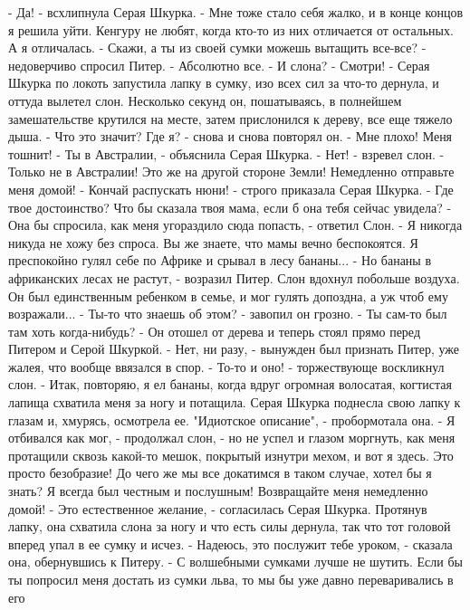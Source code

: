     - Да! - всхлипнула Серая Шкурка. - Мне тоже стало себя жалко, и в 
конце концов я решила уйти. Кенгуру не любят, когда кто-то из них 
отличается от остальных. А я отличалась.
    - Скажи, а ты из своей сумки можешь вытащить все-все? - 
недоверчиво спросил Питер.
    - Абсолютно все.
    - И слона?
    - Смотри! - Серая Шкурка по локоть запустила лапку в сумку, изо 
всех сил за что-то дернула, и оттуда вылетел слон. Несколько секунд 
он, пошатываясь, в полнейшем замешательстве крутился на месте, затем 
прислонился к дереву, все еще тяжело дыша.
    - Что это значит? Где я? - снова и снова повторял он. - Мне плохо! 
Меня тошнит!
    - Ты в Австралии, - объяснила Серая Шкурка.
    - Нет! - взревел слон. - Только не в Австралии! Это же на другой 
стороне Земли! Немедленно отправьте меня домой!
    - Кончай распускать нюни! - строго приказала Серая Шкурка. - Где 
твое достоинство? Что бы сказала твоя мама, если б она тебя сейчас 
увидела?
    - Она бы спросила, как меня угораздило сюда попасть, - ответил 
Слон. - Я никогда никуда не хожу без спроса. Вы же знаете, что мамы 
вечно беспокоятся. Я преспокойно гулял себе по Африке и срывал в лесу 
бананы...
    - Но бананы в африканских лесах не растут, - возразил Питер.
    Слон вдохнул побольше воздуха. Он был единственным ребенком в 
семье, и мог гулять допоздна, а уж чтоб ему возражали...
    - Ты-то что знаешь об этом? - завопил он грозно. - Ты сам-то был 
там хоть когда-нибудь? - Он отошел от дерева и теперь стоял прямо 
перед Питером и Серой Шкуркой.
    - Нет, ни разу, - вынужден был признать Питер, уже жалея, что 
вообще ввязался в спор.
    - То-то и оно! - торжествующе воскликнул слон. - Итак, повторяю, я 
ел бананы, когда вдруг огромная волосатая, когтистая лапища схватила 
меня за ногу и потащила.
    Серая Шкурка поднесла свою лапку к глазам и, хмурясь, осмотрела 
ее. "Идиотское описание", - пробормотала она.
    - Я отбивался как мог, - продолжал слон, - но не успел и глазом 
моргнуть, как меня протащили сквозь какой-то мешок, покрытый изнутри 
мехом, и вот я здесь. Это просто безобразие! До чего же мы все 
докатимся в таком случае, хотел бы я знать? Я всегда был честным и 
послушным! Возвращайте меня немедленно домой!
    - Это естественное желание, - согласилась Серая Шкурка. Протянув 
лапку, она схватила слона за ногу и что есть силы дернула, так что тот 
головой вперед упал в ее сумку и исчез.
    - Надеюсь, это послужит тебе уроком, - сказала она, обернувшись к 
Питеру. - С волшебными сумками лучше не шутить. Если бы ты попросил 
меня достать из сумки льва, то мы бы уже давно переваривались в его 

